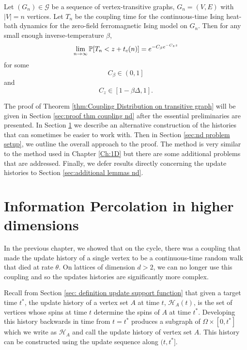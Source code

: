 \begin{theorem}
\label{thm:Coupling Distribution on transitive graph}
	Let $(G_n) \in \mathscr{G}$ be a sequence of vertex-transitive graphs, $G_n = (V, E)$ with $|V| = n$ vertices. Let $T_n$ be the coupling time for the continuous-time Ising heat-bath dynamics for the zero-field ferromagnetic Ising model on $G_n$. Then for any small enough inverse-temperature $\beta$,
	\begin{equation}
		\lim_{n \rightarrow \infty} \mathbb{P}[T_n < z + t_c(n)] = e^{-C_\beta e^{-C_z z}}
	\end{equation}
	for some
	\begin{equation}
		C_\beta \in \left(0,1\right]
	\end{equation}
	and
	\begin{equation}
		C_z \in \left[1 - \beta \Delta, 1\right].
	\end{equation}

\end{theorem}

The proof of Theorem \ref{thm:Coupling Distribution on transitive graph} will be given in Section \ref{sec:proof thm coupling nd} after the essential preliminaries are presented. In Section \ref{sec:information percolation in higher dimensions} we describe an alternative construction of the histories that can sometimes be easier to work with. Then in Section \ref{sec:nd problem setup}, we outline the overall approach to the proof. The method is very similar to the method used in Chapter \ref{Ch:1D} but there are some additional problems that are addressed. Finally, we defer results directly concerning the update histories to Section \ref{sec:additional lemmas nd}.

\section{Information Percolation in higher dimensions}
\label{sec:information percolation in higher dimensions}
In the previous chapter, we showed that on the cycle, there was a coupling that made the update history of a single vertex to be a continuous-time random walk that died at rate $\theta$. On lattices of dimension $d > 2$, we can no longer use this coupling and so the updates histories are significantly more complex. 

Recall from Section \ref{sec: definition update support function} that given a target time $t^*$, the update history of a vertex set $A$ at time $t$, $\mathcal{H}_A(t)$, is the set of vertices whose spins at time $t$ determine the spins of $A$ at time $t^*$. Developing this history backwards in time from $t = t^*$ produces a subgraph of $\Omega \times [0, t^*]$ which we write as $\mathcal{H}_A$ and call the update history of vertex set $A$. This history can be constructed using the update sequence along $(t, t^*]$. 

